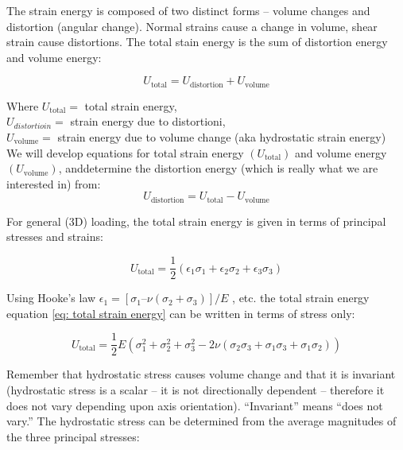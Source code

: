 The strain energy is composed of two distinct forms – volume changes and distortion (angular change). Normal strains cause a change in volume, shear strain cause distortions. The total stain energy is the sum of distortion energy and volume energy:

\begin{equation}\label{key}
U_\mathrm{total} = U_\mathrm{distortion} + U_\mathrm{volume}
\end{equation}

Where
$ U_\mathrm{total}= $ total strain energy,\\
$ U_{distortioin}= $ strain energy due to distortioni,\\
$ U_\mathrm{volume}= $ strain energy due to volume change (aka hydrostatic strain energy)\\

We will develop equations for total strain energy $ (U_\mathrm{total}) $ and volume energy $ (U_\mathrm{volume}) $, anddetermine the distortion energy (which is really what we are interested in) from: \\

\begin{equation}\label{key}
U_\mathrm{distortion} = U_\mathrm{total} - U_\mathrm{volume}
\end{equation}

For general (3D) loading, the total strain energy is given in terms of principal stresses and strains:

\begin{equation}\label{eq: total strain energy}
U_\mathrm{total} = \frac{1}{2} \left( \epsilon_1 \sigma_1 + \epsilon_2 \sigma_2 + \epsilon_3 \sigma_3 \right)
\end{equation}

Using Hooke’s law $ \epsilon_1 = [\sigma_1 – \nu (\sigma_2 + \sigma_3 )] / E $ , etc. the total strain energy equation \ref{eq: total strain energy} can be written in terms of stress only:

\begin{equation}\label{eq: total strain energy in stress}
U_\mathrm{total} = \frac{1}{2} E \left( \sigma_1^2 + \sigma_2^2 + \sigma_3^2 -2 \nu \left(\sigma_2 \sigma_3 + \sigma_1 \sigma_3 + \sigma_1 \sigma_2 \right) \right)
\end{equation}

Remember that hydrostatic stress causes volume change and that it is invariant (hydrostatic stress is a scalar – it is not directionally dependent – therefore it does not vary depending upon axis orientation). “Invariant” means “does not vary.” The hydrostatic stress can be determined from the average magnitudes of the three principal stresses:

